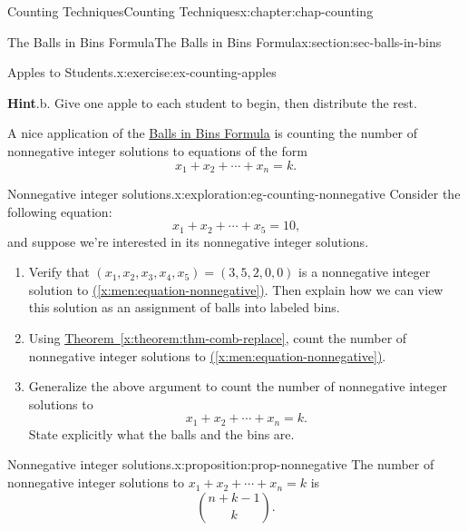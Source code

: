 \documentclass[oneside,10pt,]{book}
\newcommand{\blocktitlefont}{\relax}
\newcommand{\xreffont}{\relax}
\numberwithin{equation}{section}
\begin{document}
\begin{chapterptx}{Counting Techniques}{}{Counting Techniques}{}{}{x:chapter:chap-counting}
\begin{sectionptx}{The Balls in Bins Formula}{}{The Balls in Bins Formula}{}{}{x:section:sec-balls-in-bins}
\begin{inlineexercise}{Apples to Students.}{x:exercise:ex-counting-apples}
\begin{enumerate}[label=(\alph*)]
\end{enumerate}
%
\par\smallskip%
\noindent\textbf{\blocktitlefont Hint}.\hypertarget{g:hint:id529664}{}\quad{}b. Give one apple to each student to begin, then distribute the rest.%
\end{inlineexercise}%
A nice application of the \hyperref[x:theorem:thm-comb-replace]{Balls in Bins Formula} is counting the number of nonnegative integer solutions to equations of the form%
\begin{equation*}
x_1 + x_2 + \cdots + x_n = k\text{.}
\end{equation*}
%
\begin{exploration}{Nonnegative integer solutions.}{x:exploration:eg-counting-nonnegative}%
Consider the following equation:%
\begin{equation}
x_1 + x_2 + \cdots + x_5 = 10\text{,}\label{x:men:equation-nonnegative}
\end{equation}
and suppose we're interested in its nonnegative integer solutions.%
\begin{enumerate}[font=\bfseries,label=(\alph*),ref=\alph*]
\item{}Verify that \((x_1,x_2,x_3,x_4,x_5) = (3,5,2,0,0)\) is a nonnegative integer solution to \hyperref[x:men:equation-nonnegative]{({\xreffont\ref{x:men:equation-nonnegative}})}. Then explain how we can view this solution as an assignment of balls into labeled bins.%
\item{}Using \hyperref[x:theorem:thm-comb-replace]{Theorem~{\xreffont\ref{x:theorem:thm-comb-replace}}}, count the number of nonnegative integer solutions to \hyperref[x:men:equation-nonnegative]{({\xreffont\ref{x:men:equation-nonnegative}})}.%
\item{}Generalize the above argument to count the number of nonnegative integer solutions to%
\begin{equation*}
x_1 + x_2 + \cdots + x_n = k\text{.}
\end{equation*}
State explicitly what the balls and the bins are.%
\end{enumerate}
\end{exploration}%
\begin{proposition}{Nonnegative integer solutions.}{}{x:proposition:prop-nonnegative}%
The number of nonnegative integer solutions to \(x_1 + x_2 + \cdots + x_n = k\) is%
\begin{equation*}
\displaystyle\binom{n+k-1}{k}\text{.}
\end{equation*}
%
\end{proposition}

\end{sectionptx}
\end{chapterptx}
\end{document}
